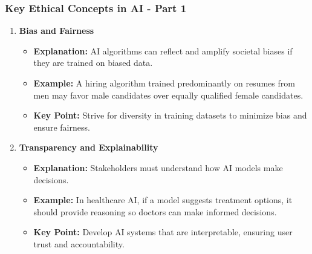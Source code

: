\documentclass[aspectratio=169]{beamer}
\begin{document}
\begin{frame}[fragile]
  \frametitle{Key Ethical Concepts in AI - Part 1}
  
  \begin{enumerate}
    \item \textbf{Bias and Fairness}
      \begin{itemize}
        \item \textbf{Explanation:} AI algorithms can reflect and amplify societal biases if they are trained on biased data.
        \item \textbf{Example:} A hiring algorithm trained predominantly on resumes from men may favor male candidates over equally qualified female candidates.
        \item \textbf{Key Point:} Strive for diversity in training datasets to minimize bias and ensure fairness.
      \end{itemize}
    
    \item \textbf{Transparency and Explainability}
      \begin{itemize}
        \item \textbf{Explanation:} Stakeholders must understand how AI models make decisions.
        \item \textbf{Example:} In healthcare AI, if a model suggests treatment options, it should provide reasoning so doctors can make informed decisions.
        \item \textbf{Key Point:} Develop AI systems that are interpretable, ensuring user trust and accountability.
      \end{itemize}
  \end{enumerate}
  
\end{frame}
\end{document}
